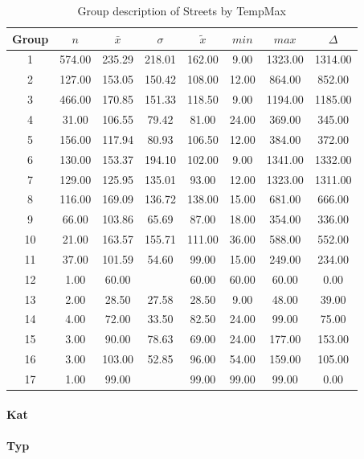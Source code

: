 \documentclass[a4paper,headsepline,footsepline,fontsize=11pt,BCOR=12mm,DIV=12]{report}
\begin{document}
\begin{table}[h]
	\small
	\centering
	\begin{tabular}{c|c|c|c|c|c|c|c}
		\toprule
		Group & $n$ & $\bar{x}$ & $\sigma$ & $\tilde{x}$ & $min$ & $max$ & $\Delta$ \\ 
		\midrule
		1 & 574.00 & 235.29 & 218.01 & 162.00 & 9.00 & 1323.00 & 1314.00   \\ 
		2 & 127.00 & 153.05 & 150.42 & 108.00 & 12.00 & 864.00 & 852.00   \\ 
		3 & 466.00 & 170.85 & 151.33 & 118.50 & 9.00 & 1194.00 & 1185.00   \\ 
		4 & 31.00 & 106.55 & 79.42 & 81.00 & 24.00 & 369.00 & 345.00   \\ 
		5 & 156.00 & 117.94 & 80.93 & 106.50 & 12.00 & 384.00 & 372.00   \\ 
		6 & 130.00 & 153.37 & 194.10 & 102.00 & 9.00 & 1341.00 & 1332.00  \\ 
		7 & 129.00 & 125.95 & 135.01 & 93.00 & 12.00 & 1323.00 & 1311.00  \\ 
		8 & 116.00 & 169.09 & 136.72 & 138.00 & 15.00 & 681.00 & 666.00  \\ 
		9 & 66.00 & 103.86 & 65.69 & 87.00 & 18.00 & 354.00 & 336.00 \\ 
		10 & 21.00 & 163.57 & 155.71 & 111.00 & 36.00 & 588.00 & 552.00   \\ 
		11 & 37.00 & 101.59 & 54.60 & 99.00 & 15.00 & 249.00 & 234.00 \\ 
		12 & 1.00 & 60.00 &  & 60.00 & 60.00 & 60.00 & 0.00 \\ 
		13 & 2.00 & 28.50 & 27.58 & 28.50 & 9.00 & 48.00 & 39.00   \\ 
		14 & 4.00 & 72.00 & 33.50 & 82.50 & 24.00 & 99.00 & 75.00  \\ 
		15 & 3.00 & 90.00 & 78.63 & 69.00 & 24.00 & 177.00 & 153.00   \\ 
		16 & 3.00 & 103.00 & 52.85 & 96.00 & 54.00 & 159.00 & 105.00   \\ 
		17 & 1.00 & 99.00 &  & 99.00 & 99.00 & 99.00 & 0.00   \\ 
 		\bottomrule
	\end{tabular}
	\caption{Group description of Streets by TempMax}
\end{table}

\paragraph{Kat}

\paragraph{Typ}
\end{document}
